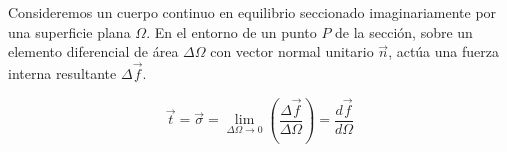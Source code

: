 Consideremos un cuerpo continuo en equilibrio seccionado imaginariamente por una superficie plana $\Omega$. En el entorno de un punto $P$ de la sección, sobre un elemento diferencial de área $\Delta \Omega$ con vector normal unitario $\vec{n}$, actúa una fuerza interna resultante $\Delta \vec{f}$.




\begin{equation}

    \vec{t} = \vec{\sigma} = \lim_{\Delta \Omega \to 0} \left( \frac{\Delta \vec{f}}{\Delta \Omega} \right) = \frac{d\vec{f}}{d\Omega}

    \label{eq:vector_tension}

\end{equation}




